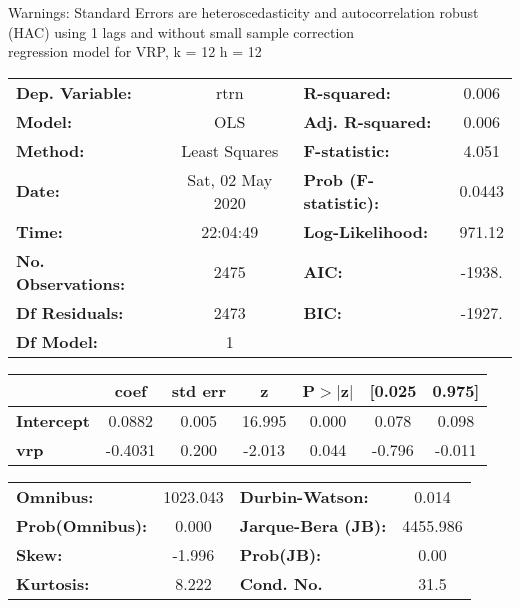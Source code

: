 Warnings: \newline
 [1] Standard Errors are heteroscedasticity and autocorrelation robust (HAC) using 1 lags and without small sample correction\\ 

regression model for VRP, k = 12 h = 12\begin{center}
\begin{tabular}{lclc}
\toprule
\textbf{Dep. Variable:}    &       rtrn       & \textbf{  R-squared:         } &     0.006   \\
\textbf{Model:}            &       OLS        & \textbf{  Adj. R-squared:    } &     0.006   \\
\textbf{Method:}           &  Least Squares   & \textbf{  F-statistic:       } &     4.051   \\
\textbf{Date:}             & Sat, 02 May 2020 & \textbf{  Prob (F-statistic):} &   0.0443    \\
\textbf{Time:}             &     22:04:49     & \textbf{  Log-Likelihood:    } &    971.12   \\
\textbf{No. Observations:} &        2475      & \textbf{  AIC:               } &    -1938.   \\
\textbf{Df Residuals:}     &        2473      & \textbf{  BIC:               } &    -1927.   \\
\textbf{Df Model:}         &           1      & \textbf{                     } &             \\
\bottomrule
\end{tabular}
\begin{tabular}{lcccccc}
                   & \textbf{coef} & \textbf{std err} & \textbf{z} & \textbf{P$> |$z$|$} & \textbf{[0.025} & \textbf{0.975]}  \\
\midrule
\textbf{Intercept} &       0.0882  &        0.005     &    16.995  &         0.000        &        0.078    &        0.098     \\
\textbf{vrp}       &      -0.4031  &        0.200     &    -2.013  &         0.044        &       -0.796    &       -0.011     \\
\bottomrule
\end{tabular}
\begin{tabular}{lclc}
\textbf{Omnibus:}       & 1023.043 & \textbf{  Durbin-Watson:     } &    0.014  \\
\textbf{Prob(Omnibus):} &   0.000  & \textbf{  Jarque-Bera (JB):  } & 4455.986  \\
\textbf{Skew:}          &  -1.996  & \textbf{  Prob(JB):          } &     0.00  \\
\textbf{Kurtosis:}      &   8.222  & \textbf{  Cond. No.          } &     31.5  \\
\bottomrule
\end{tabular}
\end{center}

